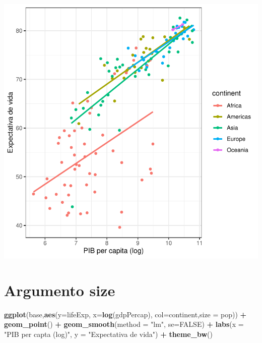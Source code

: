 \documentclass[
]{article}
\newenvironment{Shaded}{\begin{snugshade}}{\end{snugshade}}
\newcommand{\DataTypeTok}[1]{\textcolor[rgb]{0.13,0.29,0.53}{#1}}
\newcommand{\KeywordTok}[1]{\textcolor[rgb]{0.13,0.29,0.53}{\textbf{#1}}}
\newcommand{\NormalTok}[1]{#1}
\newcommand{\OperatorTok}[1]{\textcolor[rgb]{0.81,0.36,0.00}{\textbf{#1}}}
\newcommand{\OtherTok}[1]{\textcolor[rgb]{0.56,0.35,0.01}{#1}}
\newcommand{\StringTok}[1]{\textcolor[rgb]{0.31,0.60,0.02}{#1}}
\begin{document}
\begin{center}\includegraphics{arquivo_pdf_files/figure-latex/scatter3-1} \end{center}

\hypertarget{argumento-size}{%
\section{Argumento size}\label{argumento-size}}

\begin{Shaded}
\begin{Highlighting}[]
\KeywordTok{ggplot}\NormalTok{(base,}\KeywordTok{aes}\NormalTok{(}\DataTypeTok{y=}\NormalTok{lifeExp, }\DataTypeTok{x=}\KeywordTok{log}\NormalTok{(gdpPercap), }\DataTypeTok{col=}\NormalTok{continent,}\DataTypeTok{size =}\NormalTok{ pop)) }\OperatorTok{+}\StringTok{ }\KeywordTok{geom_point}\NormalTok{() }\OperatorTok{+}
\StringTok{  }\KeywordTok{geom_smooth}\NormalTok{(}\DataTypeTok{method =} \StringTok{"lm"}\NormalTok{, }\DataTypeTok{se=}\OtherTok{FALSE}\NormalTok{) }\OperatorTok{+}\StringTok{ }
\StringTok{  }\KeywordTok{labs}\NormalTok{(}\DataTypeTok{x =} \StringTok{"PIB per capta (log)"}\NormalTok{,}
       \DataTypeTok{y =} \StringTok{"Expectativa de vida"}\NormalTok{) }\OperatorTok{+}\StringTok{ }\KeywordTok{theme_bw}\NormalTok{()}
\end{Highlighting}
\end{Shaded}
\end{document}
